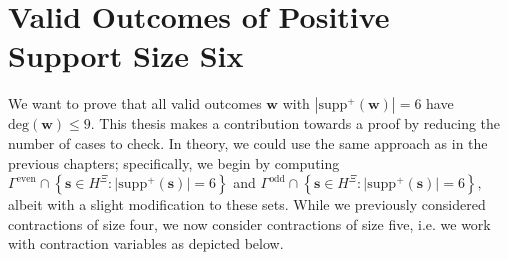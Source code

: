 \chapter{Valid Outcomes of Positive Support Size Six}

We want to prove that all valid outcomes \( \mathbf w \) with \( |\mathrm{supp}^+(\mathbf w)| = 6 \) have \( \mathrm{deg}(\mathbf w) \leq 9 \). This thesis makes a contribution towards a proof by reducing the number of cases to check. In theory, we could use the same approach as in the previous chapters; specifically, we begin by computing 
\(
\Gamma^{\mathrm{even}} \cap \left\{ \mathbf{s} \in H^{\Xi} : \lvert \mathrm{supp}^+(\mathbf{s}) \rvert = 6 \right\}
\)
and 
\(
\Gamma^{\mathrm{odd}} \cap \left\{ \mathbf{s} \in H^{\Xi} : \lvert \mathrm{supp}^+(\mathbf{s}) \rvert = 6 \right\},
\)
albeit with a slight modification to these sets. While we previously considered contractions of size four, we now consider contractions of size five, i.e. we work with contraction variables as depicted below. 
